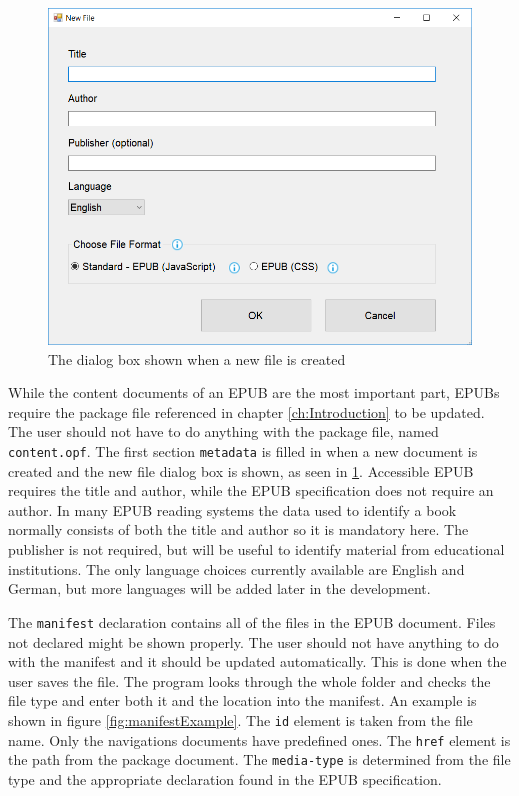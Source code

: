 \begin{figure}[h]
	\centering
	\includegraphics[width=\linewidth*4/5]{figures/newFileDialogBox.png}
	\caption{The dialog box shown when a new file is created}
	\label{fig:newFileDialogBox}
\end{figure}

While the content documents of an EPUB are the most important part, EPUBs require the package file referenced in chapter \ref{ch:Introduction} to be updated. The user should not have to do anything with the package file, named \lstinline|content.opf|. The first section \lstinline|metadata| is filled in when a new document is created and the new file dialog box is shown, as seen in \ref{fig:newFileDialogBox}. Accessible EPUB requires the title and author, while the EPUB specification does not require an author. In many EPUB reading systems the data used to identify a book normally consists of both the title and author so it is mandatory here. The publisher is not required, but will be useful to identify material from educational institutions. The only language choices currently available are English and German, but more languages will be added later in the development. 

The \lstinline|manifest| declaration contains all of the files in the EPUB document. Files not declared might be shown properly. The user should not have anything to do with the manifest and it should be updated automatically. This is done when the user saves the file. The program looks through the whole folder and checks the file type and enter both it and the location into the manifest. An example is shown in figure \ref{fig:manifestExample}. The \lstinline|id| element is taken from the file name. Only the navigations documents have predefined ones. The \lstinline|href| element is the path from the package document. The \lstinline|media-type| is determined from the file type and the appropriate declaration found in the EPUB specification.

